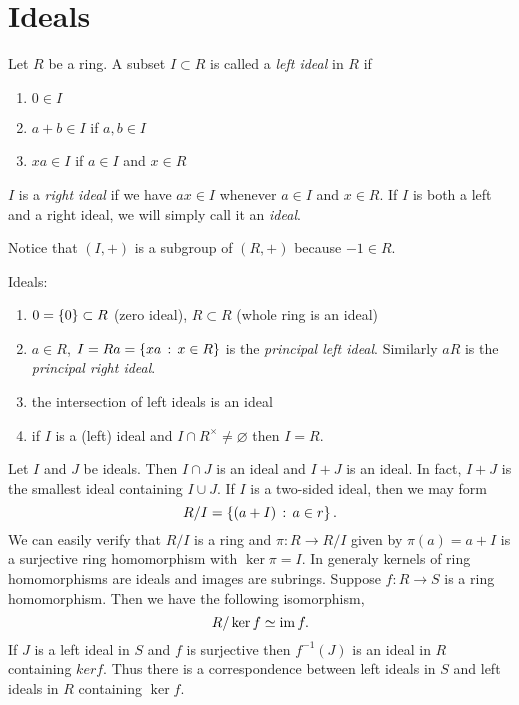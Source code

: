 \section{Ideals}

\begin{dfn}
  Let $R$ be a ring. A subset $I \subset R$ is called a \emph{left ideal} in $R$ if
  \begin{enumerate}
  \item $0 \in I$
  \item $a + b \in I$ if $a, b \in I$
  \item $x a \in I$ if $a \in I$ and $x \in R$
  \end{enumerate}
  $I$ is a \emph{right ideal} if we have $a x \in I$ whenever $a \in I$ and $x \in R$. If $I$ is both a left and a right ideal, we will simply call it an \emph{ideal}.
\end{dfn}
Notice that $(I, +)$ is a subgroup of $(R, +)$ because $-1 \in R$. 

\begin{eg}
  Ideals:
  \begin{enumerate}
  \item $0 = \left\{0\right\} \subset R$ (zero ideal), $R \subset R$ (whole ring is an ideal)
  \item $a \in R$, $I = R a = \left\{x a \,:\, x \in R\right\}$ is the \emph{principal left ideal}. Similarly $a R$ is the \emph{principal right ideal}.
  \item the intersection of left ideals is an ideal
  \item if $I$ is a (left) ideal and $I \cap R^\times \neq \varnothing$ then $I = R$.
  \end{enumerate}
\end{eg}

Let $I$ and $J$ be ideals. Then $I \cap J$ is an ideal and $I + J$ is an ideal. In fact, $I + J$ is the smallest ideal containing $I \cup J$. If $I$ is a two-sided ideal, then we may form
\[
R / I = \left\{(a + I) \,:\, a \in r\right\}.
\]
We can easily verify that $R / I$ is a ring and $\pi : R \to R / I$ given by $\pi(a) = a + I$ is a surjective ring homomorphism with $\ker \pi = I$. In generaly kernels of ring homomorphisms are ideals and images are subrings. Suppose $f : R \to S$ is a ring homomorphism. Then we have the following isomorphism,
\[
R / \ker f \simeq \mathrm{im}\, f.
\]
If $J$ is a left ideal in $S$ and $f$ is surjective then $f^{-1}(J)$ is an ideal in $R$ containing $ker f$. Thus there is a correspondence between left ideals in $S$ and left ideals in $R$ containing $\ker f$.

